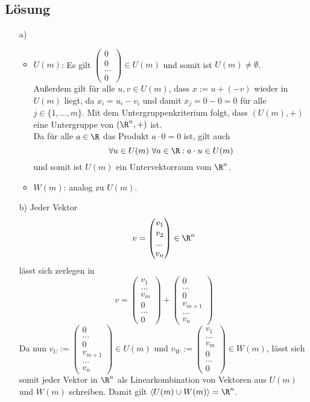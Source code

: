 \subsection*{L\"osung}
\begin{itemize}
\item[a)] 
	\begin{itemize}
	\item $U(m)$: Es gilt $\begin{pmatrix} 0 \\ 0 \\ ... \\ 0 \end{pmatrix} \in U(m)$ und somit ist $U(m)\ne \emptyset$.\\ Außerdem gilt für alle $u,v \in U(m)$, dass $x:=u+(-v)$ wieder in $U(m)$ liegt, da $ x_i=u_i-v_i$ und damit $x_j=0-0=0$ für alle $j \in \{1,...,m\}$. Mit dem Untergruppenkriterium folgt, dass $(U(m),+)$ eine Untergruppe von $(\R^n,+)$ ist.\\
	Da für alle $a \in \R$ das Produkt $a\cdot 0=0$ ist, gilt auch 
	$$
	\forall u \in U(m) \ \forall a \in \R: a \cdot u \in U(m)
	$$
	und somit ist $U(m)$ ein Untervektorraum vom $\R^n$.
	\item $W(m)$: analog zu $U(m)$.
	\end{itemize}
\item[b)] Jeder Vektor 
$$
v=\begin{pmatrix} v_1\\ v_2 \\ ... \\ v_n \end{pmatrix} \in \R^n
$$
lässt sich zerlegen in
$$
v=\begin{pmatrix} v_1 \\...\\v_m \\0\\ ... \\ 0 \end{pmatrix}+\begin{pmatrix} 0  \\ ... \\0\\ v_{m+1} \\ ...\\v_n \end{pmatrix}
$$
Da nun $v_U:=\begin{pmatrix} 0  \\ ... \\0\\ v_{m+1} \\ ...\\v_n \end{pmatrix} \in U(m)$ und $v_W:=\begin{pmatrix} v_1 \\...\\v_m \\0\\ ... \\ 0 \end{pmatrix} \in W(m)$, lässt sich somit jeder Vektor in $\R^n$ als Linearkombination von Vektoren aus $U(m)$ und $W(m)$ schreiben. Damit gilt $\langle U(m)\cup W(m) \rangle = \R^n$.

\end{itemize}
